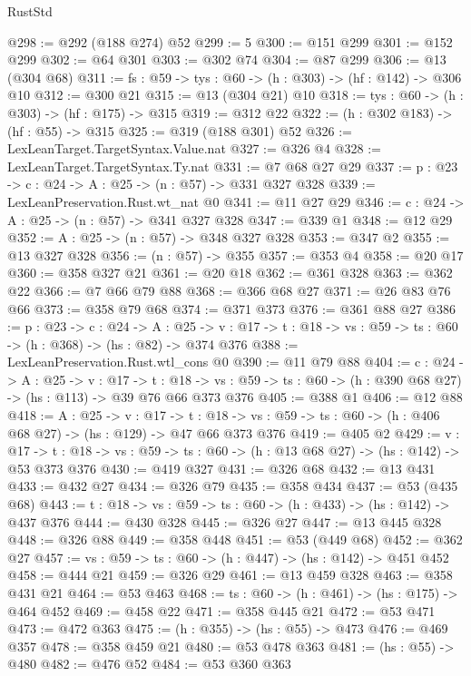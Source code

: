 \begin{lexlean}{RustStd}
\begin{coremodule}
@298 := @292 (@188 @274) @52
@299 := 5
@300 := @151 @299
@301 := @152 @299
@302 := @64 @301
@303 := @302 @74
@304 := @87 @299
@306 := @13 (@304 @68)
@311 := {fs : @59} -> {tys : @60} -> (h : @303) -> (hf : @142) -> @306 @10
@312 := @300 @21
@315 := @13 (@304 @21) @10
@318 := {tys : @60} -> (h : @303) -> (hf : @175) -> @315
@319 := @312 @22
@322 := (h : @302 @183) -> (hf : @55) -> @315
@325 := @319 (@188 @301) @52
@326 := LexLeanTarget.TargetSyntax.Value.nat
@327 := @326 @4
@328 := LexLeanTarget.TargetSyntax.Ty.nat
@331 := @7 @68 @27 @29
@337 := {p : @23} -> {c : @24} -> {A : @25} -> (n : @57) -> @331 @327 @328
@339 := LexLeanPreservation.Rust.wt_nat @0
@341 := @11 @27 @29
@346 := {c : @24} -> {A : @25} -> (n : @57) -> @341 @327 @328
@347 := @339 @1
@348 := @12 @29
@352 := {A : @25} -> (n : @57) -> @348 @327 @328
@353 := @347 @2
@355 := @13 @327 @328
@356 := (n : @57) -> @355
@357 := @353 @4
@358 := @20 @17
@360 := @358 @327 @21
@361 := @20 @18
@362 := @361 @328
@363 := @362 @22
@366 := @7 @66 @79 @88
@368 := @366 @68 @27
@371 := @26 @83 @76 @66
@373 := @358 @79 @68
@374 := @371 @373
@376 := @361 @88 @27
@386 := {p : @23} ->
  {c : @24} ->
  {A : @25} ->
  {v : @17} -> {t : @18} -> {vs : @59} -> {ts : @60} -> (h : @368) -> (hs : @82) -> @374 @376
@388 := LexLeanPreservation.Rust.wtl_cons @0
@390 := @11 @79 @88
@404 := {c : @24} ->
  {A : @25} ->
  {v : @17} ->
  {t : @18} ->
  {vs : @59} -> {ts : @60} -> (h : @390 @68 @27) -> (hs : @113) -> @39 @76 @66 @373 @376
@405 := @388 @1
@406 := @12 @88
@418 := {A : @25} ->
  {v : @17} ->
  {t : @18} -> {vs : @59} -> {ts : @60} -> (h : @406 @68 @27) -> (hs : @129) -> @47 @66 @373 @376
@419 := @405 @2
@429 := {v : @17} ->
  {t : @18} -> {vs : @59} -> {ts : @60} -> (h : @13 @68 @27) -> (hs : @142) -> @53 @373 @376
@430 := @419 @327
@431 := @326 @68
@432 := @13 @431
@433 := @432 @27
@434 := @326 @79
@435 := @358 @434
@437 := @53 (@435 @68)
@443 := {t : @18} -> {vs : @59} -> {ts : @60} -> (h : @433) -> (hs : @142) -> @437 @376
@444 := @430 @328
@445 := @326 @27
@447 := @13 @445 @328
@448 := @326 @88
@449 := @358 @448
@451 := @53 (@449 @68)
@452 := @362 @27
@457 := {vs : @59} -> {ts : @60} -> (h : @447) -> (hs : @142) -> @451 @452
@458 := @444 @21
@459 := @326 @29
@461 := @13 @459 @328
@463 := @358 @431 @21
@464 := @53 @463
@468 := {ts : @60} -> (h : @461) -> (hs : @175) -> @464 @452
@469 := @458 @22
@471 := @358 @445 @21
@472 := @53 @471
@473 := @472 @363
@475 := (h : @355) -> (hs : @55) -> @473
@476 := @469 @357
@478 := @358 @459 @21
@480 := @53 @478 @363
@481 := (hs : @55) -> @480
@482 := @476 @52
@484 := @53 @360 @363

\end{coremodule}
\end{lexlean}
